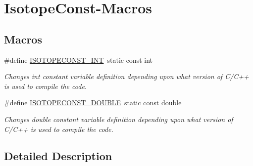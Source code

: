 \hypertarget{group___isotope_const-_macros}{}\section{Isotope\+Const-\/\+Macros}
\label{group___isotope_const-_macros}
\subsection*{Macros}
\begin{DoxyCompactItemize}
\item 
\mbox{\label{group___isotope_const-_macros_ga5f18360b3e99483a35c32d789e62621c}} 
\#define \mbox{\hyperlink{group___isotope_const-_macros_ga5f18360b3e99483a35c32d789e62621c}{I\+S\+O\+T\+O\+P\+E\+C\+O\+N\+S\+T\+\_\+\+I\+NT}}~static const int
\begin{DoxyCompactList}\small\item\em Changes int constant variable definition depending upon what version of C/\+C++ is used to compile the code. \end{DoxyCompactList}\item 
\mbox{\label{group___isotope_const-_macros_ga8f45a7272ce02c0b4c65c44636ed719a}} 
\#define \mbox{\hyperlink{group___isotope_const-_macros_ga8f45a7272ce02c0b4c65c44636ed719a}{I\+S\+O\+T\+O\+P\+E\+C\+O\+N\+S\+T\+\_\+\+D\+O\+U\+B\+LE}}~static const double
\begin{DoxyCompactList}\small\item\em Changes double constant variable definition depending upon what version of C/\+C++ is used to compile the code. \end{DoxyCompactList}\end{DoxyCompactItemize}


\subsection{Detailed Description}
